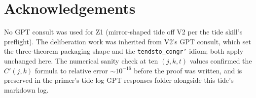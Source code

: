 \documentclass[11pt]{article}
\begin{document}
\section*{Acknowledgements}

No GPT consult was used for Z1 (mirror-shaped tide off V2 per the
tide skill's preflight). The deliberation work was inherited from
V2's GPT consult, which set the three-theorem packaging shape and
the \texttt{tendsto\_congr'} idiom; both apply unchanged here. The
numerical sanity check at ten $(j, k, t)$ values confirmed the
$C'(j, k)$ formula to relative error ${\sim}10^{-16}$ before the
proof was written, and is preserved in the primer's tide-log
GPT-responses folder alongside this tide's markdown log.
\end{document}

